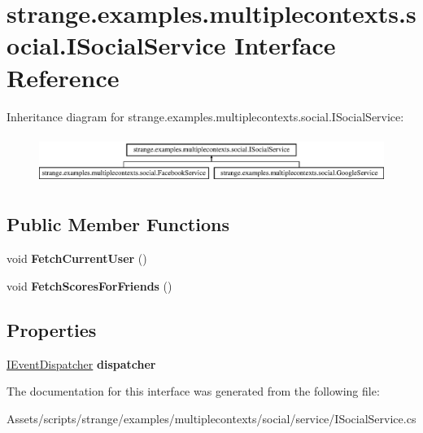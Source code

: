 \hypertarget{interfacestrange_1_1examples_1_1multiplecontexts_1_1social_1_1_i_social_service}{\section{strange.\-examples.\-multiplecontexts.\-social.\-I\-Social\-Service Interface Reference}
\label{interfacestrange_1_1examples_1_1multiplecontexts_1_1social_1_1_i_social_service}
}
Inheritance diagram for strange.\-examples.\-multiplecontexts.\-social.\-I\-Social\-Service\-:\begin{figure}[H]
\begin{center}
\leavevmode
\includegraphics[height=1.595442cm]{interfacestrange_1_1examples_1_1multiplecontexts_1_1social_1_1_i_social_service}
\end{center}
\end{figure}
\subsection*{Public Member Functions}
\begin{DoxyCompactItemize}
\item 
\hypertarget{interfacestrange_1_1examples_1_1multiplecontexts_1_1social_1_1_i_social_service_abffc79da0852be70d91c786e1bf95046}{void {\bfseries Fetch\-Current\-User} ()}\label{interfacestrange_1_1examples_1_1multiplecontexts_1_1social_1_1_i_social_service_abffc79da0852be70d91c786e1bf95046}

\item 
\hypertarget{interfacestrange_1_1examples_1_1multiplecontexts_1_1social_1_1_i_social_service_a6159674587ab053c2dae4c05bf78106f}{void {\bfseries Fetch\-Scores\-For\-Friends} ()}\label{interfacestrange_1_1examples_1_1multiplecontexts_1_1social_1_1_i_social_service_a6159674587ab053c2dae4c05bf78106f}

\end{DoxyCompactItemize}
\subsection*{Properties}
\begin{DoxyCompactItemize}
\item 
\hypertarget{interfacestrange_1_1examples_1_1multiplecontexts_1_1social_1_1_i_social_service_a1ff7767899582b6cb45ba28dd717e927}{\hyperlink{interfacestrange_1_1extensions_1_1dispatcher_1_1eventdispatcher_1_1api_1_1_i_event_dispatcher}{I\-Event\-Dispatcher} {\bfseries dispatcher}}\label{interfacestrange_1_1examples_1_1multiplecontexts_1_1social_1_1_i_social_service_a1ff7767899582b6cb45ba28dd717e927}

\end{DoxyCompactItemize}


The documentation for this interface was generated from the following file\-:\begin{DoxyCompactItemize}
\item 
Assets/scripts/strange/examples/multiplecontexts/social/service/I\-Social\-Service.\-cs\end{DoxyCompactItemize}
